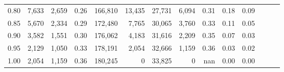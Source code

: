 \begin{tabular}{rrrrrrrrrrrrrr}
0.80 &   7,633 &  2,659 &  0.26 &  166,810 &   13,435 &  27,731 &   6,094 &  0.31 &  0.18 &      0.09 \\
0.85 &   5,670 &  2,334 &  0.29 &  172,480 &    7,765 &  30,065 &   3,760 &  0.33 &  0.11 &      0.05 \\
0.90 &   3,582 &  1,551 &  0.30 &  176,062 &    4,183 &  31,616 &   2,209 &  0.35 &  0.07 &      0.03 \\
0.95 &   2,129 &  1,050 &  0.33 &  178,191 &    2,054 &  32,666 &   1,159 &  0.36 &  0.03 &      0.02 \\
1.00 &   2,054 &  1,159 &  0.36 &  180,245 &        0 &  33,825 &       0 &   nan &  0.00 &      0.00 \\
\bottomrule
\end{tabular}
